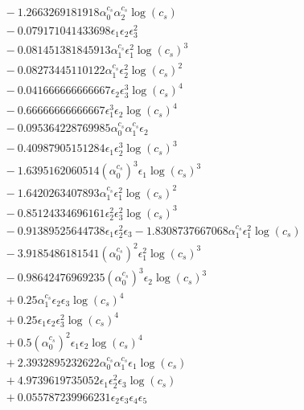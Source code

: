 \documentclass[10pt]{article}
\begin{document}
\begin{align*}
&{}  - 1.2663269181918 \alpha_{0}^{c_s} \alpha_{2}^{c_s} \log{\left(c_{s} \right)} \\
&{}  - 0.079171041433698 \epsilon_{1} \epsilon_{2} \epsilon_{3}^{2} \\
&{}  - 0.081451381845913 \alpha_{1}^{c_s} \epsilon_{1}^{2} \log{\left(c_{s} \right)}^{3} \\
&{}  - 0.08273445110122 \alpha_{1}^{c_s} \epsilon_{2}^{2} \log{\left(c_{s} \right)}^{2} \\
&{}  - 0.041666666666667 \epsilon_{2} \epsilon_{3}^{3} \log{\left(c_{s} \right)}^{4} \\
&{}  - 0.66666666666667 \epsilon_{1}^{3} \epsilon_{2} \log{\left(c_{s} \right)}^{4} \\
&{}  - 0.095364228769985 \alpha_{0}^{c_s} \alpha_{1}^{c_s} \epsilon_{2} \\
&{}  - 0.40987905151284 \epsilon_{1} \epsilon_{2}^{3} \log{\left(c_{s} \right)}^{3} \\
&{}  - 1.6395162060514 \left(\alpha_{0}^{c_s}\right)^{3} \epsilon_{1} \log{\left(c_{s} \right)}^{3} \\
&{}  - 1.6420263407893 \alpha_{1}^{c_s} \epsilon_{1}^{2} \log{\left(c_{s} \right)}^{2} \\
&{}  - 0.85124334696161 \epsilon_{2}^{2} \epsilon_{3}^{2} \log{\left(c_{s} \right)}^{3} \\
&{}  - 0.91389525644738 \epsilon_{1} \epsilon_{2}^{2} \epsilon_{3} - 1.8308737667068 \alpha_{1}^{c_s} \epsilon_{1}^{2} \log{\left(c_{s} \right)} \\
&{}  - 3.9185486181541 \left(\alpha_{0}^{c_s}\right)^{2} \epsilon_{1}^{2} \log{\left(c_{s} \right)}^{3} \\
&{}  - 0.98642476969235 \left(\alpha_{0}^{c_s}\right)^{3} \epsilon_{2} \log{\left(c_{s} \right)}^{3} \\
&{}  + 0.25 \alpha_{1}^{c_s} \epsilon_{2} \epsilon_{3} \log{\left(c_{s} \right)}^{4} \\
&{}  + 0.25 \epsilon_{1} \epsilon_{2} \epsilon_{3}^{2} \log{\left(c_{s} \right)}^{4} \\
&{}  + 0.5 \left(\alpha_{0}^{c_s}\right)^{2} \epsilon_{1} \epsilon_{2} \log{\left(c_{s} \right)}^{4} \\
&{}  + 2.3932895232622 \alpha_{0}^{c_s} \alpha_{1}^{c_s} \epsilon_{1} \log{\left(c_{s} \right)} \\
&{}  + 4.9739619735052 \epsilon_{1} \epsilon_{2}^{2} \epsilon_{3} \log{\left(c_{s} \right)} \\
&{}  + 0.055787239966231 \epsilon_{2} \epsilon_{3} \epsilon_{4} \epsilon_{5} \\

\end{align*}
\end{document}
